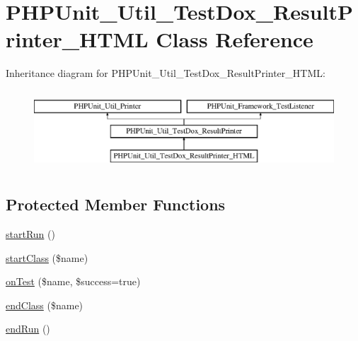 \hypertarget{class_p_h_p_unit___util___test_dox___result_printer___h_t_m_l}{}\section{P\+H\+P\+Unit\+\_\+\+Util\+\_\+\+Test\+Dox\+\_\+\+Result\+Printer\+\_\+\+H\+T\+ML Class Reference}
\label{class_p_h_p_unit___util___test_dox___result_printer___h_t_m_l}
Inheritance diagram for P\+H\+P\+Unit\+\_\+\+Util\+\_\+\+Test\+Dox\+\_\+\+Result\+Printer\+\_\+\+H\+T\+ML\+:\begin{figure}[H]
\begin{center}
\leavevmode
\includegraphics[height=3.000000cm]{class_p_h_p_unit___util___test_dox___result_printer___h_t_m_l}
\end{center}
\end{figure}
\subsection*{Protected Member Functions}
\begin{DoxyCompactItemize}
\item 
\mbox{\hyperlink{class_p_h_p_unit___util___test_dox___result_printer___h_t_m_l_abed24f32f95c38cdce0c4b84db2f6888}{start\+Run}} ()
\item 
\mbox{\hyperlink{class_p_h_p_unit___util___test_dox___result_printer___h_t_m_l_a646956a1369c611cc5cad829c44ac03f}{start\+Class}} (\$name)
\item 
\mbox{\hyperlink{class_p_h_p_unit___util___test_dox___result_printer___h_t_m_l_a723ae879488ca3d36ebf29c09a4e01dc}{on\+Test}} (\$name, \$success=true)
\item 
\mbox{\hyperlink{class_p_h_p_unit___util___test_dox___result_printer___h_t_m_l_aa11acea793bf8d2730e17dc210be5d3d}{end\+Class}} (\$name)
\item 
\mbox{\hyperlink{class_p_h_p_unit___util___test_dox___result_printer___h_t_m_l_a39a423505faaaee7e10ab3e160ea3217}{end\+Run}} ()
\end{DoxyCompactItemize}
